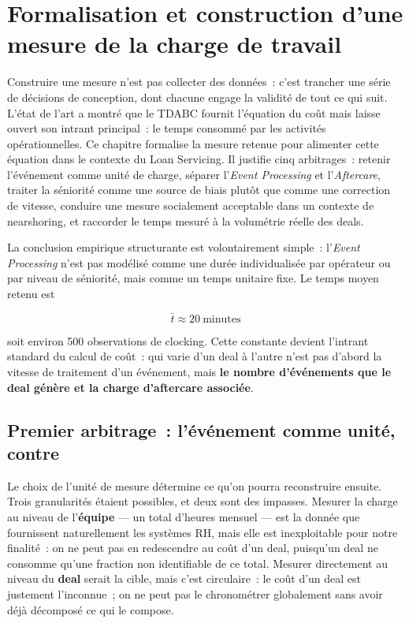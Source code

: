 \section{Formalisation et construction d'une mesure de la charge de travail}
\label{construction-mesure}

Construire une mesure n'est pas collecter des données~: c'est trancher une série de décisions de conception, dont chacune engage la validité de tout ce qui suit. L'état de l'art a montré que le TDABC fournit l'équation du coût mais laisse ouvert son intrant principal~: le temps consommé par les activités opérationnelles. Ce chapitre formalise la mesure retenue pour alimenter cette équation dans le contexte du Loan Servicing. Il justifie cinq arbitrages~: retenir l'événement comme unité de charge, séparer l'\textit{Event Processing} et l'\textit{Aftercare}, traiter la séniorité comme une source de biais plutôt que comme une correction de vitesse, conduire une mesure socialement acceptable dans un contexte de nearshoring, et raccorder le temps mesuré à la volumétrie réelle des deals.

La conclusion empirique structurante est volontairement simple~: l'\textit{Event Processing} n'est pas modélisé comme une durée individualisée par opérateur ou par niveau de séniorité, mais comme un temps unitaire fixe. Le temps moyen retenu est

\begin{equation}
\bar{t} \approx 20\ \text{minutes}
\label{eq:temps-unitaire-ep}
\end{equation}

\noindent soit environ 500 observations de clocking. Cette constante devient l'intrant standard du calcul de coût~: qui varie d'un deal à l'autre n'est pas d'abord la vitesse de traitement d'un événement, mais \textbf{le nombre d'événements que le deal génère et la charge d'aftercare associée}.

\subsection{Premier arbitrage~: l'événement comme unité, contre }
\label{sec:arbitrage-unite}

Le choix de l'unité de mesure détermine ce qu'on pourra reconstruire ensuite. Trois granularités étaient possibles, et deux sont des impasses. Mesurer la charge au niveau de l'\textbf{équipe} --- un total d'heures mensuel --- est la donnée que fournissent naturellement les systèmes RH, mais elle est inexploitable pour notre finalité~: on ne peut pas en redescendre au coût d'un deal, puisqu'un deal ne consomme qu'une fraction non identifiable de ce total. Mesurer directement au niveau du \textbf{deal} serait la cible, mais c'est circulaire~: le coût d'un deal est justement l'inconnue~; on ne peut pas le chronométrer globalement sans avoir déjà décomposé ce qui le compose.

